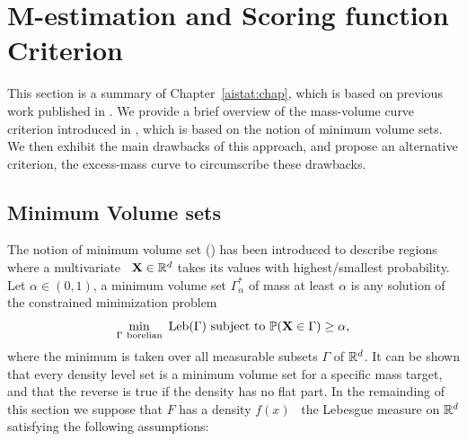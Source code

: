 \section{M-estimation and Scoring function Criterion}
\label{resume:scoring}

This section is a summary of Chapter~\ref{aistat:chap}, which is based on previous work published in \cite{AISTAT15}. We provide a brief overview of the mass-volume curve criterion introduced in \cite{CLEM13}, which is based on the notion of minimum volume sets. We then exhibit the main drawbacks of this approach, and propose an alternative criterion, the excess-mass curve to circumscribe these drawbacks. 

\subsection{Minimum Volume sets}
\label{resume:mv-set}
The notion of minimum volume set (\cite{Polonik97, Einmahl1992}) has been introduced to describe regions where a multivariate \rv~$\mathbf X \in \mathbb{R}^d$ takes its values with highest/smallest probability.  Let $\alpha\in (0,1)$, a minimum volume set $\Gamma^*_{\alpha}$ of mass at least $\alpha$ is any solution of the constrained minimization problem
\begin{equation}\label{eq:MV}\min_{\Gamma~ \text{borelian}} ~\text{Leb}(\Gamma) \mbox{~subject to~} \mathbb{P}(\mathbf X \in \Gamma) \ge \alpha,
\end{equation}
where the minimum is taken over all measurable subsets $\Gamma$ of $\mathbb{R}^d$.
It can be shown that every density level set is a minimum volume set for a specific mass target, and that the reverse is true if the density has no flat part. %
%
In the remainding of this section we suppose that $F$ has a density $f(x)$ \wrt~the Lebesgue measure on $\mathbb{R}^d$ satisfying the following assumptions:

